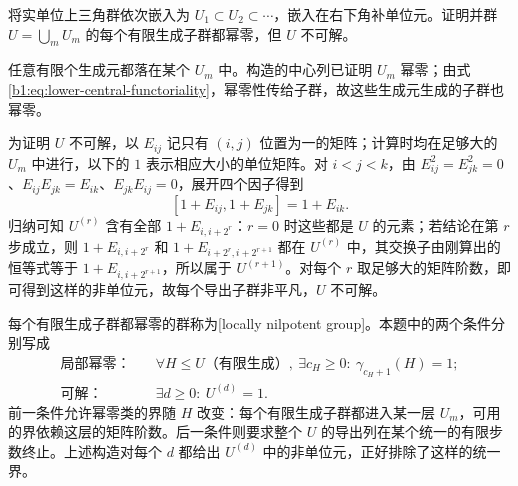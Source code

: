 \begin{exercise}\label{b1:ex:07-infinite-unitriangular}
	将实单位上三角群依次嵌入为 \(U_1\subset U_2\subset\cdots\)，嵌入在右下角补单位元。证明并群 \(U=\bigcup_m U_m\) 的每个有限生成子群都幂零，但 \(U\) 不可解。
\end{exercise}
\begin{solution}
	任意有限个生成元都落在某个 \(U_m\) 中。构造的中心列已证明 \(U_m\) 幂零；由式\eqref{b1:eq:lower-central-functoriality}，幂零性传给子群，故这些生成元生成的子群也幂零。

	为证明 \(U\) 不可解，以 \(E_{ij}\) 记只有 \((i,j)\) 位置为一的矩阵；计算时均在足够大的 \(U_m\) 中进行，以下的 \(1\) 表示相应大小的单位矩阵。对 \(i<j<k\)，由 \(E_{ij}^2=E_{jk}^2=0\)、\(E_{ij}E_{jk}=E_{ik}\)、\(E_{jk}E_{ij}=0\)，展开四个因子得到
	\[
		[1+E_{ij},1+E_{jk}]=1+E_{ik}.
	\]
	归纳可知 \(U^{(r)}\) 含有全部 \(1+E_{i,i+2^r}\)：\(r=0\) 时这些都是 \(U\) 的元素；若结论在第 \(r\) 步成立，则 \(1+E_{i,i+2^r}\) 和 \(1+E_{i+2^r,i+2^{r+1}}\) 都在 \(U^{(r)}\) 中，其交换子由刚算出的恒等式等于 \(1+E_{i,i+2^{r+1}}\)，所以属于 \(U^{(r+1)}\)。对每个 \(r\) 取足够大的矩阵阶数，即可得到这样的非单位元，故每个导出子群非平凡，\(U\) 不可解。

	每个有限生成子群都幂零的群称为[locally nilpotent group]。本题中的两个条件分别写成
	\[
		\begin{aligned}
			\text{局部幂零：}\quad& \forall H\le U\text{（有限生成）},\
			\exists c_H\ge0:\ \gamma_{c_H+1}(H)=1;\\
			\text{可解：}\quad& \exists d\ge0:\ U^{(d)}=1.
		\end{aligned}
	\]
	前一条件允许幂零类的界随 \(H\) 改变：每个有限生成子群都进入某一层 \(U_m\)，可用的界依赖这层的矩阵阶数。后一条件则要求整个 \(U\) 的导出列在某个统一的有限步数终止。上述构造对每个 \(d\) 都给出 \(U^{(d)}\) 中的非单位元，正好排除了这样的统一界。
\end{solution}
